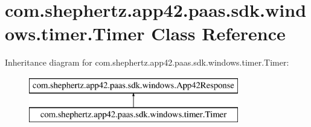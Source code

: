 \hypertarget{classcom_1_1shephertz_1_1app42_1_1paas_1_1sdk_1_1windows_1_1timer_1_1_timer}{\section{com.\+shephertz.\+app42.\+paas.\+sdk.\+windows.\+timer.\+Timer Class Reference}
\label{classcom_1_1shephertz_1_1app42_1_1paas_1_1sdk_1_1windows_1_1timer_1_1_timer}
}
Inheritance diagram for com.\+shephertz.\+app42.\+paas.\+sdk.\+windows.\+timer.\+Timer\+:\begin{figure}[H]
\begin{center}
\leavevmode
\includegraphics[height=2.000000cm]{classcom_1_1shephertz_1_1app42_1_1paas_1_1sdk_1_1windows_1_1timer_1_1_timer}
\end{center}
\end{figure}
